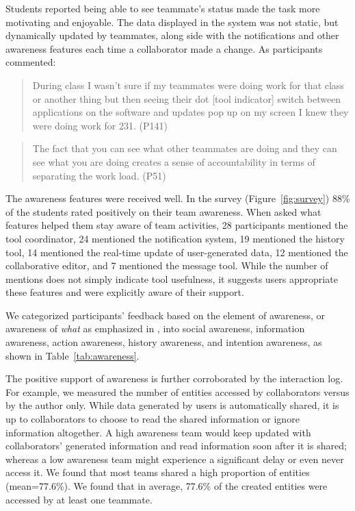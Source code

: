 Students reported being able to see teammate's status made the task more
motivating and enjoyable. The data displayed in the system was not static, but
dynamically updated by teammates, along side with the notifications and other
awareness features each time a collaborator made a change. As participants
commented:

\begin{quote}
During class I wasn't sure if my teammates were doing work for that
class or another thing but then seeing their dot {[}tool indicator{]}
switch between applications on the software and updates pop up on my
screen I knew they were doing work for 231. (P141)
\end{quote}

\begin{quote}
The fact that you can see what other teammates are doing and they can
see what you are doing creates a sense of accountability in terms of
separating the work load. (P51)
\end{quote}

The awareness features were received well. In the survey
(Figure~\ref{fig:survey}) 88\% of the students rated positively on their team
awareness. When asked what features helped them stay aware of team activities,
28 participants mentioned the tool coordinator, 24 mentioned the notification
system, 19 mentioned the history tool, 14 mentioned the real-time update of
user-generated data, 12 mentioned the collaborative editor, and 7 mentioned the
message tool. While the number of mentions does not simply indicate tool
usefulness, it suggests users appropriate these features and were explicitly
aware of their support.

We categorized participants' feedback based on the element of awareness, or
awareness of \emph{what} as emphasized in \autocite{Schmidt2002}, into social
awareness, information awareness, action awareness, history awareness, and
intention awareness, as shown in Table~\ref{tab:awareness}.



The positive support of awareness is further corroborated by the interaction
log. For example, we measured the number of entities accessed by collaborators
versus by the author only. While data generated by users is automatically
shared, it is up to collaborators to choose to read the shared information or
ignore information altogether. A high awareness team would keep updated with
collaborators' generated information and read information soon after it is
shared; whereas a low awareness team might experience a significant delay or
even never access it. We found that most teams shared a high proportion of
entities (mean=77.6\%). We found that in average, 77.6\% of the created entities
were accessed by at least one teammate.


